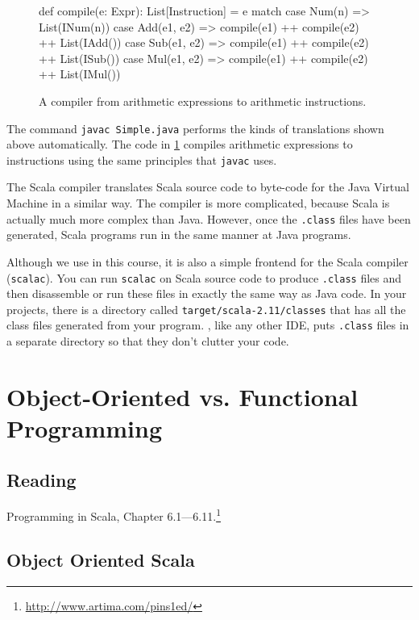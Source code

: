 \documentclass[9pt]{extbook}
\begin{document}
\begin{figure}
\begin{scalacode}
def compile(e: Expr): List[Instruction] = e match {
  case Num(n) => List(INum(n))
  case Add(e1, e2) => compile(e1) ++ compile(e2) ++ List(IAdd())
  case Sub(e1, e2) => compile(e1) ++ compile(e2) ++ List(ISub())
  case Mul(e1, e2) => compile(e1) ++ compile(e2) ++ List(IMul())
}
\end{scalacode}
\caption{A compiler from arithmetic expressions to arithmetic instructions.}
\label{arithcompiler}
\end{figure}

The command \verb|javac Simple.java| performs the kinds of translations shown
above automatically. The code in \cref{arithcompiler} compiles arithmetic expressions
to instructions using the same principles that \verb|javac| uses.

The Scala compiler translates Scala source code to byte-code for the Java Virtual Machine
in a similar way. The compiler is more complicated, because Scala is actually much more
complex than Java. However, once the \verb|.class| files have been generated, Scala
programs run in the same manner at Java programs.

Although we use \sbt{} in this course, it is also a simple frontend
for the Scala compiler (\verb|scalac|). You can run \verb|scalac| on
Scala source code to produce \verb|.class| files and then disassemble
or run these files in exactly the same way as Java code. In your
\sbt{} projects, there is a directory called
\verb|target/scala-2.11/classes| that has all the class files
generated from your program. \sbt{}, like any other IDE, puts
\verb|.class| files in a separate directory so that they don't clutter
your code.





\chapter{Object-Oriented vs. Functional Programming}

\section{Reading}

Programming in Scala, Chapter 6.1---6.11.\footnote{\url{http://www.artima.com/pins1ed/}}

\section{Object Oriented Scala}
\end{document}
